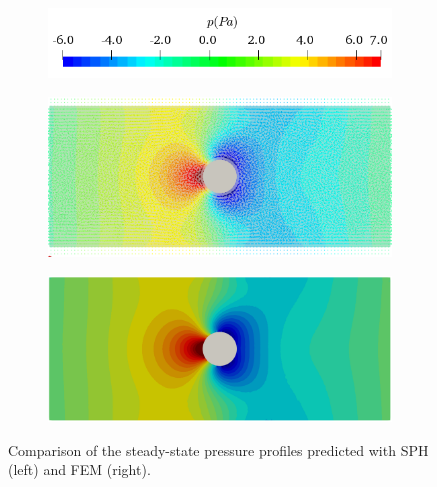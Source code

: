\begin{figure}[H]
	\centering
	\begin{subfigure}{0.45\columnwidth}    
		\centering
		\includegraphics[width=1.0\textwidth]{images/FSI_Comparison/FOC_p.png}
	\end{subfigure}
	
	\begin{subfigure}{0.47\columnwidth}    
		\centering
		\includegraphics[width=1.0\textwidth]{images/FSI_Comparison/FOC_SPH_p.png}
	\end{subfigure}
	\begin{subfigure}{0.47\columnwidth}
		\centering
		\includegraphics[width=1.0\textwidth]{images/FSI_Comparison/FOC_FEM_p.png}
	\end{subfigure}
	\caption{Comparison of the steady-state pressure profiles predicted with  SPH (left) and FEM (right). }    \label{fig:FoCP_fsi}
\end{figure} 
